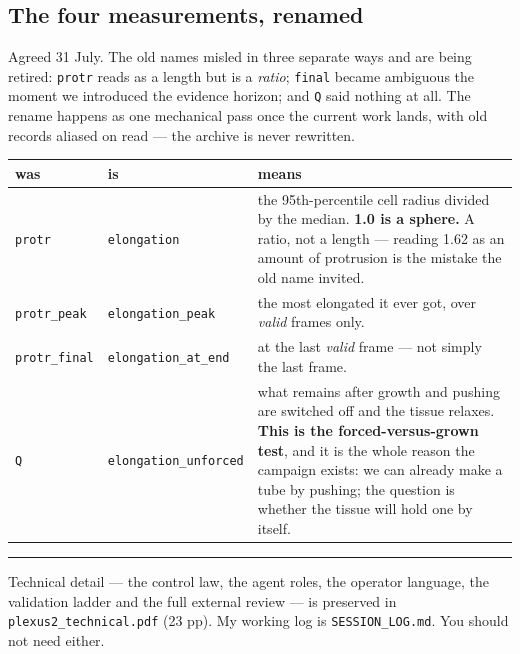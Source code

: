 \documentclass[11pt,a4paper]{article}
\newcommand{\code}[1]{\texttt{#1}}
\begin{document}
\subsection*{The four measurements, renamed}

Agreed 31 July. The old names misled in three separate ways and are being retired: \code{protr}
reads as a length but is a \emph{ratio}; \code{final} became ambiguous the moment we introduced
the evidence horizon; and \code{Q} said nothing at all. The rename happens as one mechanical pass
once the current work lands, with old records aliased on read --- the archive is never rewritten.

\begin{center}\small
\begin{tabular}{@{}l l p{7.9cm}@{}}
\toprule
\textbf{was} & \textbf{is} & \textbf{means}\\
\midrule
\code{protr} & \code{elongation}
& the 95th-percentile cell radius divided by the median. \textbf{1.0 is a sphere.} A ratio, not a
length --- reading 1.62 as an amount of protrusion is the mistake the old name invited.\\
\code{protr\_peak} & \code{elongation\_peak}
& the most elongated it ever got, over \emph{valid} frames only.\\
\code{protr\_final} & \code{elongation\_at\_end}
& at the last \emph{valid} frame --- not simply the last frame.\\
\code{Q} & \code{elongation\_unforced}
& what remains after growth and pushing are switched off and the tissue relaxes.
\textbf{This is the forced-versus-grown test}, and it is the whole reason the campaign exists: we
can already make a tube by pushing; the question is whether the tissue will hold one by itself.\\
\bottomrule
\end{tabular}
\end{center}

\vspace{6pt}
\hrule
\vspace{6pt}
{\small\color{grey}
Technical detail --- the control law, the agent roles, the operator language, the validation
ladder and the full external review --- is preserved in \texttt{plexus2\_technical.pdf} (23 pp).
My working log is \texttt{SESSION\_LOG.md}. You should not need either.}
\end{document}

